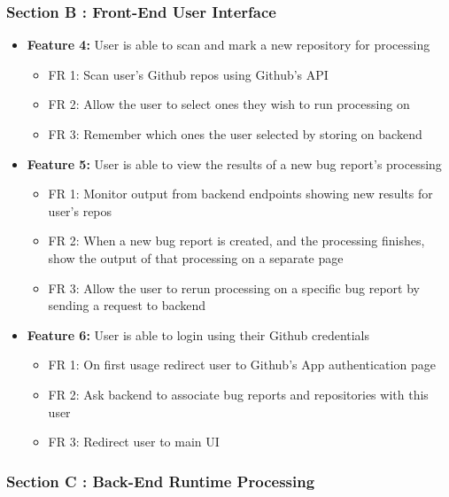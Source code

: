 \documentclass[11pt,]{article}
\providecommand{\tightlist}{%
  \setlength{\itemsep}{0pt}\setlength{\parskip}{0pt}}
\begin{document}
\hypertarget{section-b-front-end-user-interface}{%
\subsubsection{Section B : Front-End User
Interface}\label{section-b-front-end-user-interface}}

\begin{itemize}
\tightlist
\item
  \textbf{Feature 4:} User is able to scan and mark a new repository for
  processing

  \begin{itemize}
  \tightlist
  \item
    FR 1: Scan user's Github repos using Github's API
  \item
    FR 2: Allow the user to select ones they wish to run processing on
  \item
    FR 3: Remember which ones the user selected by storing on backend
  \end{itemize}
\item
  \textbf{Feature 5:} User is able to view the results of a new bug
  report's processing

  \begin{itemize}
  \tightlist
  \item
    FR 1: Monitor output from backend endpoints showing new results for
    user's repos
  \item
    FR 2: When a new bug report is created, and the processing finishes,
    show the output of that processing on a separate page
  \item
    FR 3: Allow the user to rerun processing on a specific bug report by
    sending a request to backend
  \end{itemize}
\item
  \textbf{Feature 6:} User is able to login using their Github
  credentials

  \begin{itemize}
  \tightlist
  \item
    FR 1: On first usage redirect user to Github's App authentication
    page
  \item
    FR 2: Ask backend to associate bug reports and repositories with
    this user
  \item
    FR 3: Redirect user to main UI
  \end{itemize}
\end{itemize}

\hypertarget{section-c-back-end-runtime-processing}{%
\subsubsection{Section C : Back-End Runtime
Processing}\label{section-c-back-end-runtime-processing}}
\end{document}
